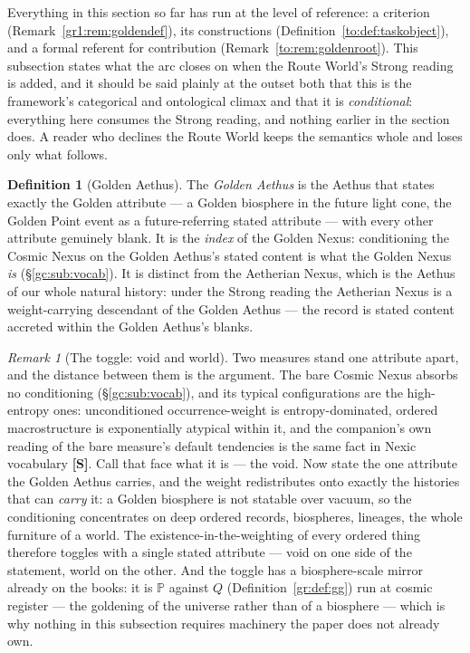 \documentclass[11pt]{article}
\numberwithin{equation}{section}
\theoremstyle{plain}
\theoremstyle{definition}
\newtheorem{definition}[theorem]{Definition}
\theoremstyle{remark}
\newtheorem{remark}[theorem]{Remark}
\newcommand{\PP}{\mathbb{P}}
\begin{document}
Everything in this section so far has run at the level of reference:
a criterion (Remark~\ref{gr1:rem:goldendef}), its constructions
(Definition~\ref{to:def:taskobject}), and a formal referent for
contribution (Remark~\ref{to:rem:goldenroot}). This subsection states
what the arc closes on when the Route World's Strong reading is added,
and it should be said plainly at the outset both that this is the
framework's categorical and ontological climax and that it is
\emph{conditional}: everything here consumes the Strong reading, and
nothing earlier in the section does. A reader who declines the Route
World keeps the semantics whole and loses only what follows.

\begin{definition}[Golden Aethus]\label{to:def:goldenaethus}
The \emph{Golden Aethus} is the Aethus that states exactly the Golden
attribute --- a Golden biosphere in the future light cone, the Golden
Point event as a future-referring stated attribute --- with every
other attribute genuinely blank. It is the \emph{index} of the Golden
Nexus: conditioning the Cosmic Nexus on the Golden Aethus's stated
content is what the Golden Nexus \emph{is} (\S\ref{gc:sub:vocab}).
It is distinct from the Aetherian Nexus, which is the Aethus of our
whole natural history: under the Strong reading the Aetherian Nexus is
a weight-carrying descendant of the Golden Aethus --- the record is
stated content accreted within the Golden Aethus's blanks.
\end{definition}

\begin{remark}[The toggle: void and world]\label{to:rem:toggle}
Two measures stand one attribute apart, and the distance between them
is the argument. The bare Cosmic Nexus absorbs no conditioning
(\S\ref{gc:sub:vocab}), and its typical configurations are the
high-entropy ones: unconditioned occurrence-weight is
entropy-dominated, ordered macrostructure is exponentially atypical
within it, and the companion's own reading of the bare measure's
default tendencies is the same fact in Nexic vocabulary
\cite{Nexus} \textbf{[S]}. Call that face what it is --- the void.
Now state the one attribute the Golden Aethus carries, and the weight
redistributes onto exactly the histories that can \emph{carry} it: a
Golden biosphere is not statable over vacuum, so the conditioning
concentrates on deep ordered records, biospheres, lineages, the whole
furniture of a world. The existence-in-the-weighting of every ordered
thing therefore toggles with a single stated attribute --- void on one
side of the statement, world on the other. And the toggle has a
biosphere-scale mirror already on the books: it is $\PP$ against $Q$
(Definition~\ref{gr:def:gg}) run at cosmic register --- the goldening
of the universe rather than of a biosphere --- which is why nothing in
this subsection requires machinery the paper does not already own.
\end{remark}
\end{document}
